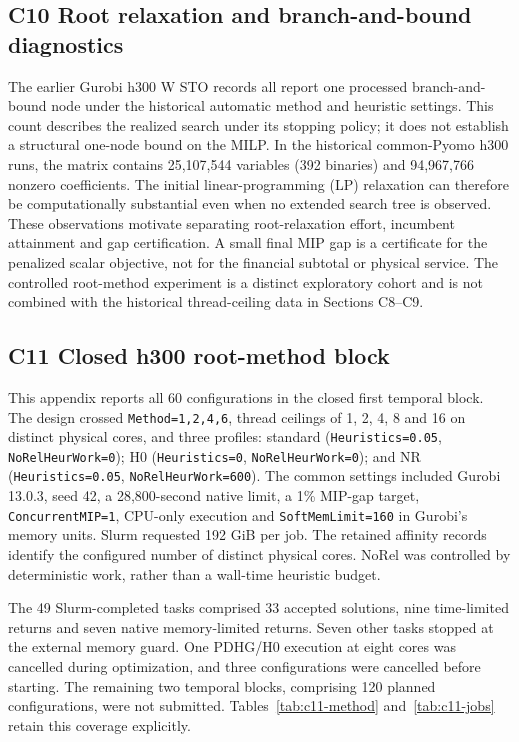 \documentclass[
  english,
  11pt,
  a4paper,
]{article}
\begin{document}
\subsection{C10 Root relaxation and branch-and-bound diagnostics}\label{c10-root-relaxation-and-branch-and-bound-diagnostics}

The earlier Gurobi h300 W STO records all report one processed branch-and-bound node under the historical automatic method and heuristic settings. This count describes the realized search under its stopping policy; it does not establish a structural one-node bound on the MILP. In the historical common-Pyomo h300 runs, the matrix contains 25,107,544 variables (392 binaries) and 94,967,766 nonzero coefficients. The initial linear-programming (LP) relaxation can therefore be computationally substantial even when no extended search tree is observed. These observations motivate separating root-relaxation effort, incumbent attainment and gap certification. A small final MIP gap is a certificate for the penalized scalar objective, not for the financial subtotal or physical service. The controlled root-method experiment is a distinct exploratory cohort and is not combined with the historical thread-ceiling data in Sections C8--C9.

\subsection{C11 Closed h300 root-method block}\label{c11-partial-h300-root-method-experiment}

This appendix reports all 60 configurations in the closed first temporal block. The design crossed \texttt{Method=1,2,4,6}, thread ceilings of 1, 2, 4, 8 and 16 on distinct physical cores, and three profiles: standard (\texttt{Heuristics=0.05}, \texttt{NoRelHeurWork=0}); H0 (\texttt{Heuristics=0}, \texttt{NoRelHeurWork=0}); and NR (\texttt{Heuristics=0.05}, \texttt{NoRelHeurWork=600}). The common settings included Gurobi 13.0.3, seed 42, a 28,800-second native limit, a 1\% MIP-gap target, \texttt{ConcurrentMIP=1}, CPU-only execution and \texttt{SoftMemLimit=160} in Gurobi's memory units. Slurm requested 192 GiB per job. The retained affinity records identify the configured number of distinct physical cores. NoRel was controlled by deterministic work, rather than a wall-time heuristic budget.

The 49 Slurm-completed tasks comprised 33 accepted solutions, nine time-limited returns and seven native memory-limited returns. Seven other tasks stopped at the external memory guard. One PDHG/H0 execution at eight cores was cancelled during optimization, and three configurations were cancelled before starting. The remaining two temporal blocks, comprising 120 planned configurations, were not submitted. Tables~\ref{tab:c11-method} and~\ref{tab:c11-jobs} retain this coverage explicitly.
\end{document}
